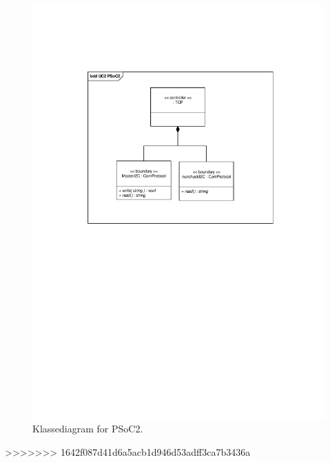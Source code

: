 \begin{figure}[H]
	\centering
	\includegraphics[trim = {3.8cm 13.8cm 3.3cm 4.5cm}, clip = true, width=\textwidth] {Systemarkitektur/images/klassediagramPSoC2.pdf}
	\caption{Klassediagram for PSoC2.}
	\label{fig:klassePSoC2}
\end{figure}
>>>>>>> 1642f087d41d6a5acb1d946d53adff3ca7b3436a
